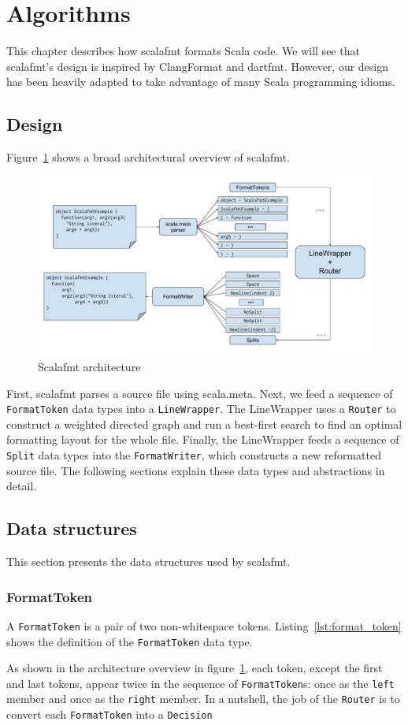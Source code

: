 \section{Algorithms}\label{sec:algorithms}
This chapter describes how scalafmt formats Scala code.
We will see that scalafmt's design is inspired by ClangFormat and dartfmt.
However, our design has been heavily adapted to take advantage of many Scala programming idioms.

\subsection{Design}
Figure~\ref{fig:architecture} shows a broad architectural overview of scalafmt.
\begin{figure}
  \centering
  \includegraphics[width=\textwidth]{img/architechture.pdf}
  \caption{Scalafmt architecture}
  \label{fig:architecture}
\end{figure}
First, scalafmt parses a source file using scala.meta.
Next, we feed a sequence of \texttt{FormatToken} data types into a \texttt{LineWrapper}.
The LineWrapper uses a \texttt{Router} to construct a weighted directed graph and run a best-first search to find an optimal formatting layout for the whole file.
Finally, the LineWrapper feeds a sequence of \texttt{Split} data types into the \texttt{FormatWriter}, which constructs a new reformatted source file.
The following sections explain these data types and abstractions in detail.

\subsection{Data structures}
This section presents the data structures used by scalafmt.

\subsubsection{FormatToken}
A \texttt{FormatToken} is a pair of two non-whitespace tokens.
Listing~\ref{lst:format_token} shows the definition of the \texttt{FormatToken} data type.

As shown in the architecture overview in figure~\ref{fig:architecture}, each token, except the first and last tokens, appear twice in the sequence of \texttt{FormatToken}s: once as the \texttt{left} member and once as the \texttt{right} member.
In a nutshell, the job of the \texttt{Router} is to convert each \texttt{FormatToken} into a \texttt{Decision}

